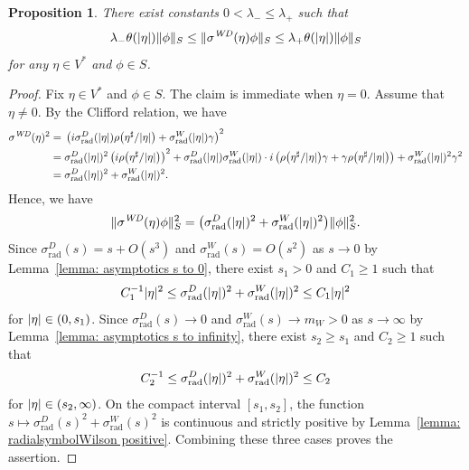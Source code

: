 \documentclass[a4paper,oneside,12pt]{amsart}
\theoremstyle{plain}
\newtheorem{proposition}[theorem]{Proposition}
\theoremstyle{definition}
\theoremstyle{remark}
\DeclarePairedDelimiter{\abs}{\lvert}{\rvert}
\DeclarePairedDelimiter{\norm}{\lVert}{\rVert}
\newcommand{\cliffordmultiplication}{\rho}
\newcommand{\symbolDirac}{\sigma^D}
\newcommand{\symbolWilson}{\sigma^W}
\newcommand{\symbolWilsonDirac}{\sigma^{\mathit{WD}}}
\newcommand{\radialsymbolDirac}{\symbolDirac_{\mathrm{rad}}}
\newcommand{\radialsymbolWilson}{\symbolWilson_{\mathrm{rad}}}
\begin{document}
\begin{proposition}\label{proposition: uniform ellipticity of the symbols}
  There exist constants $0 < \lambda_- \le \lambda_+$ such that
  \begin{equation}
    \lambda_- \theta(\abs{\eta}) \norm{\phi}_S \le \norm{\symbolWilsonDirac(\eta)\phi}_S \le \lambda_+ \theta(\abs{\eta}) \norm{\phi}_S
  \end{equation}
  for any $\eta \in V^*$ and $\phi \in S$.
\end{proposition}
\begin{proof}
  Fix $\eta \in V^*$ and $\phi \in S$.
  The claim is immediate when $\eta = 0$.
  Assume that $\eta \ne 0$.
  By the Clifford relation, we have
  \begin{equation}
    \begin{aligned}
    \symbolWilsonDirac(\eta)^2 ={}& \left( i \radialsymbolDirac(\abs{\eta}) \cliffordmultiplication\big(\eta^{\sharp}/\abs{\eta}\big) + \radialsymbolWilson(\abs{\eta}) \gamma \right)^2 \\
    ={}& \radialsymbolDirac(\abs{\eta})^2 \left(i\cliffordmultiplication\big(\eta^{\sharp}/\abs{\eta}\big)\right)^2 + \radialsymbolDirac(\abs{\eta})\radialsymbolWilson(\abs{\eta}) \cdot i \left( \cliffordmultiplication\big(\eta^{\sharp}/\abs{\eta}\big) \gamma + \gamma \cliffordmultiplication\big(\eta^{\sharp}/\abs{\eta}\big) \right) + \radialsymbolWilson(\abs{\eta})^2 \gamma^2 \\
    ={}& \radialsymbolDirac(\abs{\eta})^2 + \radialsymbolWilson(\abs{\eta})^2.
    \end{aligned}
  \end{equation}
  Hence, we have
  \begin{equation}
    \norm{\symbolWilsonDirac(\eta)\phi}_S^2 = \big( \radialsymbolDirac(\abs{\eta})^2 + \radialsymbolWilson(\abs{\eta})^2 \big) \norm{\phi}_S^2.
  \end{equation}
  Since $\radialsymbolDirac(s) = s + O(s^3)$ and $\radialsymbolWilson(s) = O(s^2)$ as $s \to 0$ by Lemma~\ref{lemma: asymptotics s to 0}, there exist $s_1 > 0$ and $C_1 \ge 1$ such that
  \begin{equation}
    C_1^{-1} \abs{\eta}^2 \le \radialsymbolDirac(\abs{\eta})^2 + \radialsymbolWilson(\abs{\eta})^2 \le C_1 \abs{\eta}^2
  \end{equation}
  for $\abs{\eta} \in (0,s_1)$.
  Since $\radialsymbolDirac(s) \to 0$ and $\radialsymbolWilson(s) \to m_W > 0$ as $s \to \infty$ by Lemma~\ref{lemma: asymptotics s to infinity}, there exist $s_2 \ge s_1$ and $C_2  \ge 1$ such that
  \begin{equation}
    C_2^{-1} \le \radialsymbolDirac(\abs{\eta})^2 + \radialsymbolWilson(\abs{\eta})^2 \le C_2
  \end{equation}
  for $\abs{\eta} \in (s_2,\infty)$.
  On the compact interval $[s_1,s_2]$, the function $s \mapsto \radialsymbolDirac(s)^2 + \radialsymbolWilson(s)^2$ is continuous and strictly positive by Lemma~\ref{lemma: radialsymbolWilson positive}.
  Combining these three cases proves the assertion.
\end{proof}
\end{document}
